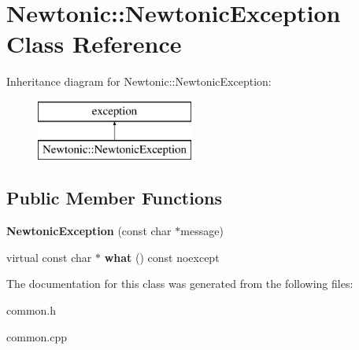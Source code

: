 \hypertarget{classNewtonic_1_1NewtonicException}{}\section{Newtonic\+::Newtonic\+Exception Class Reference}
\label{classNewtonic_1_1NewtonicException}
Inheritance diagram for Newtonic\+::Newtonic\+Exception\+:\begin{figure}[H]
\begin{center}
\leavevmode
\includegraphics[height=2.000000cm]{classNewtonic_1_1NewtonicException}
\end{center}
\end{figure}
\subsection*{Public Member Functions}
\begin{DoxyCompactItemize}
\item 
\mbox{\label{classNewtonic_1_1NewtonicException_aa7c5ccf023f4a0ac22a84ae5a20aa303}} 
{\bfseries Newtonic\+Exception} (const char $\ast$message)
\item 
\mbox{\label{classNewtonic_1_1NewtonicException_abfb1b9d908c180556f0534530ea8b5cb}} 
virtual const char $\ast$ {\bfseries what} () const noexcept
\end{DoxyCompactItemize}


The documentation for this class was generated from the following files\+:\begin{DoxyCompactItemize}
\item 
common.\+h\item 
common.\+cpp\end{DoxyCompactItemize}
